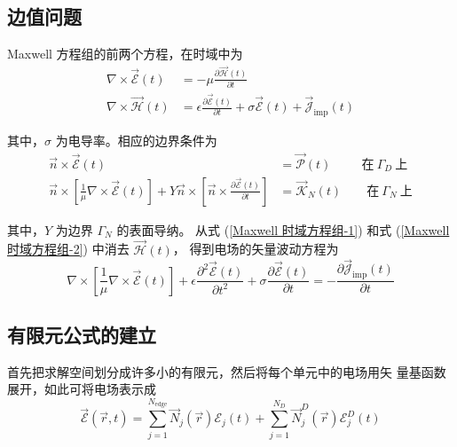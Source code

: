 \subsection{边值问题}

\par Maxwell 方程组的前两个方程，在时域中为
\begin{align}
    \label{Maxwell 时域方程组-1}
    \nabla\times\vec{\mathscr{E}}(t)&=-\mu\frac{\partial\vec{\mathscr{H}}(t)}{\partial t}\\
    \label{Maxwell 时域方程组-2}
    \nabla\times\vec{\mathscr{H}}(t)
    &=\epsilon\frac{\partial\vec{\mathscr{E}}(t)}{\partial t}
    +\sigma\vec{\mathscr{E}}(t)
    +\vec{\mathscr{J}}_{\text{imp}}(t)
\end{align}
\par 其中，$\sigma$ 为电导率。相应的边界条件为
\begin{align}
    \label{时域边界条件-1}
    \vec{n}\times\vec{\mathscr{E}}(t)&=\vec{\mathscr{P}}(t)
    \ \ \qquad \text{在}\ \Gamma_D\ \text{上}\\
    \label{时域边界条件-2}
    \vec{n}\times\left[
        \frac{1}{\mu}\nabla\times\vec{\mathscr{E}}(t)
    \right]
    +Y \vec{n}\times\left[
        \vec{n}\times\frac{\partial \vec{\mathscr{E}}(t)}{\partial t}
    \right]
    &=\vec{\mathscr{K}}_N(t)
    \qquad \text{在}\ \Gamma_N\ \text{上}
\end{align}
\par 其中，$Y$ 为边界 $\Gamma_N$ 的表面导纳。
从式 (\ref{Maxwell 时域方程组-1}) 和式 (\ref{Maxwell 时域方程组-2}) 中消去 $\vec{\mathscr{H}}(t)$，
得到电场的矢量波动方程为
\begin{equation}
    \nabla\times\left[
        \frac{1}{\mu}\nabla\times\vec{\mathscr{E}}(t)
    \right]+\epsilon\frac{\partial^2\vec{\mathscr{E}}(t)}{\partial t^2}
    +\sigma\frac{\partial\vec{\mathscr{E}}(t)}{\partial t}
    =-\frac{\partial \vec{\mathscr{J}}_{\text{imp}}(t)}{\partial t}
    \label{时域矢量波动方程}
\end{equation}

\subsection{有限元公式的建立}

\par 首先把求解空间划分成许多小的有限元，然后将每个单元中的电场用矢
量基函数展开，如此可将电场表示成
\begin{equation}
    \vec{\mathscr{E}}(\vec{r},t)=
    \sum_{j=1}^{N_{\text{edge}}}\vec{N}_j(\vec{r})\mathscr{E}_j(t)
    +\sum_{j=1}^{N_D}\vec{N}_j^D(\vec{r})\mathscr{E}_j^D(t)
\end{equation}

